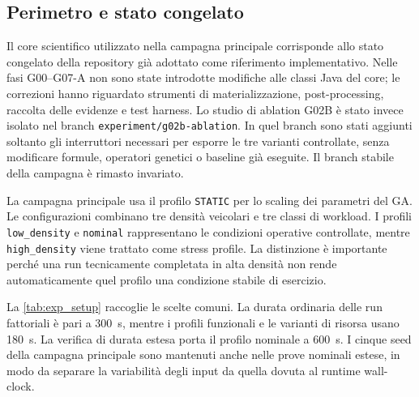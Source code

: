 \subsection{Perimetro e stato congelato}
\label{subsec:exp_perimetro}

Il core scientifico utilizzato nella campagna principale corrisponde allo stato congelato della repository già adottato come riferimento implementativo. Nelle fasi G00--G07-A non sono state introdotte modifiche alle classi Java del core; le correzioni hanno riguardato strumenti di materializzazione, post-processing, raccolta delle evidenze e test harness. Lo studio di ablation G02B è stato invece isolato nel branch \texttt{experiment/g02b-ablation}. In quel branch sono stati aggiunti soltanto gli interruttori necessari per esporre le tre varianti controllate, senza modificare formule, operatori genetici o baseline già eseguite. Il branch stabile della campagna è rimasto invariato.

La campagna principale usa il profilo \texttt{STATIC} per lo scaling dei parametri del GA. Le configurazioni combinano tre densità veicolari e tre classi di workload. I profili \texttt{low\_density} e \texttt{nominal} rappresentano le condizioni operative controllate, mentre \texttt{high\_density} viene trattato come stress profile. La distinzione è importante perché una run tecnicamente completata in alta densità non rende automaticamente quel profilo una condizione stabile di esercizio.

La \cref{tab:exp_setup} raccoglie le scelte comuni. La durata ordinaria delle run fattoriali è pari a 300~s, mentre i profili funzionali e le varianti di risorsa usano 180~s. La verifica di durata estesa porta il profilo nominale a 600~s. I cinque seed della campagna principale sono mantenuti anche nelle prove nominali estese, in modo da separare la variabilità degli input da quella dovuta al runtime wall-clock.

